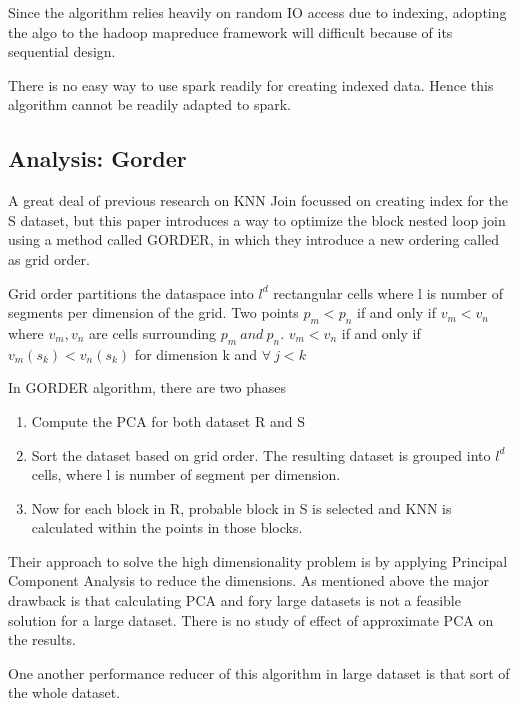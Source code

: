 \documentclass[conference]{IEEEtran}
\begin{document}
\medskip

Since the algorithm relies heavily on random IO access due to
indexing, adopting the algo to the hadoop mapreduce framework will
difficult because of its sequential design.

\medskip

There is no easy way to use spark readily for creating indexed
data. Hence this algorithm cannot be readily adapted to spark.

\bigskip

\subsection{Analysis: Gorder}
A great deal of previous research on KNN Join focussed on creating
index for the S dataset, but this paper \cite{xia_gorder:_2004} introduces a
way to optimize the block nested loop join using a method called
GORDER, in which they introduce a new ordering called as grid order.

\medskip

Grid order partitions the dataspace into $l^d$ rectangular cells where
l is number of segments per dimension of the grid. Two points $p_m <
p_n $ if and only if $v_m < v_n$ where $v_m, v_n$ are cells
surrounding $p_m\ and\ p_n$. $v_m < v_n$ if and only if $v_m(s_k) <
v_n(s_k)$ for dimension k and $\forall\ j < k$
\bigskip

In GORDER algorithm, there are two phases
\begin{enumerate}
\item Compute the PCA for both dataset R and S
\item Sort the dataset based on grid order. The resulting dataset is
  grouped into $l^d$ cells, where l is number of segment per
  dimension.
\item Now for each block in R, probable block in S is selected and KNN
  is calculated within the points in those blocks.
\end{enumerate}

\bigskip

Their approach to solve the high dimensionality problem is
by applying Principal Component Analysis to reduce the dimensions. As
mentioned above the major drawback is that calculating PCA and fory
large datasets is not a feasible solution for a large dataset. There
is no study of effect of approximate PCA on the results.

\medskip

One another performance reducer of this algorithm in large dataset is that sort
of the whole dataset.
\end{document}
